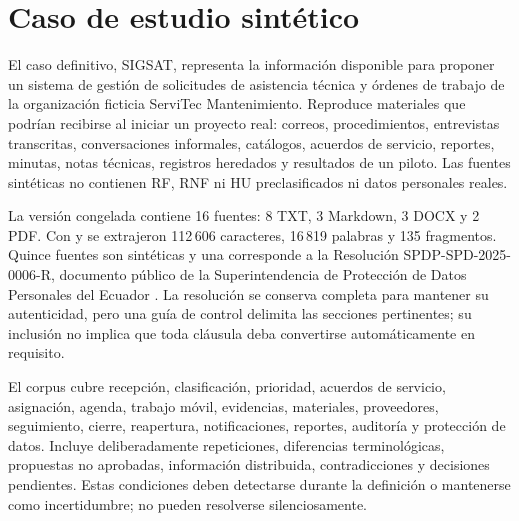 \section{Caso de estudio sintético}

El caso definitivo, SIGSAT, representa la información disponible para proponer un sistema de gestión de solicitudes de asistencia técnica y órdenes de trabajo de la organización ficticia ServiTec Mantenimiento. Reproduce materiales que podrían recibirse al iniciar un proyecto real: correos, procedimientos, entrevistas transcritas, conversaciones informales, catálogos, acuerdos de servicio, reportes, minutas, notas técnicas, registros heredados y resultados de un piloto. Las fuentes sintéticas no contienen RF, RNF ni HU preclasificados ni datos personales reales.

La versión congelada  contiene 16 fuentes: 8 TXT, 3 Markdown, 3 DOCX y 2 PDF. Con  y  se extrajeron 112\,606 caracteres, 16\,819 palabras y 135 fragmentos. Quince fuentes son sintéticas y una corresponde a la Resolución SPDP-SPD-2025-0006-R, documento público de la Superintendencia de Protección de Datos Personales del Ecuador \cite{spdp2025}. La resolución se conserva completa para mantener su autenticidad, pero una guía de control delimita las secciones pertinentes; su inclusión no implica que toda cláusula deba convertirse automáticamente en requisito.

El corpus cubre recepción, clasificación, prioridad, acuerdos de servicio, asignación, agenda, trabajo móvil, evidencias, materiales, proveedores, seguimiento, cierre, reapertura, notificaciones, reportes, auditoría y protección de datos. Incluye deliberadamente repeticiones, diferencias terminológicas, propuestas no aprobadas, información distribuida, contradicciones y decisiones pendientes. Estas condiciones deben detectarse durante la definición o mantenerse como incertidumbre; no pueden resolverse silenciosamente.

